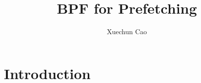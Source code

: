 \documentclass[10pt, twocolumn, letterpaper]{article}
\begin{document}
	\title{\vspace{-1.5cm}BPF for Prefetching}
	\author{Xuechun Cao}
	\date{}
	
	\maketitle
	
	\section{Introduction}
	\label{sec:introduction}
	
	
	
	
\end{document}
